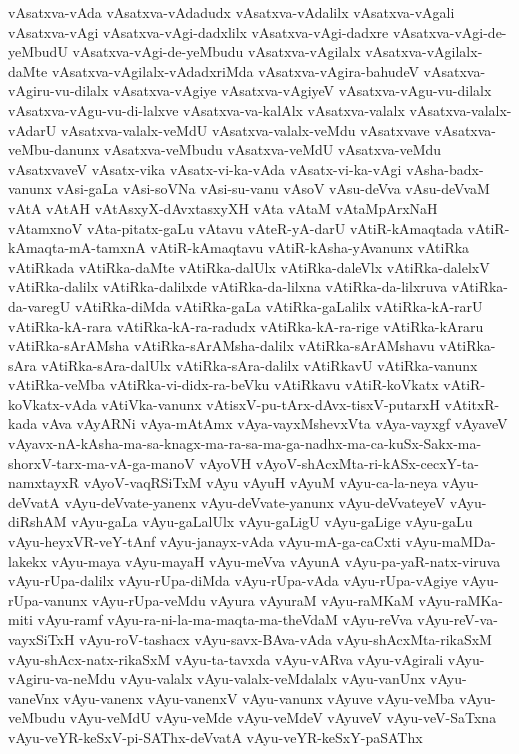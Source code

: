 {vAsatxva-vAda
vAsatxva-vAdadudx
vAsatxva-vAdalilx
vAsatxva-vAgali
vAsatxva-vAgi
vAsatxva-vAgi-dadxlilx
vAsatxva-vAgi-dadxre
vAsatxva-vAgi-de-yeMbudU
vAsatxva-vAgi-de-yeMbudu
vAsatxva-vAgilalx
vAsatxva-vAgilalx-daMte
vAsatxva-vAgilalx-vAdadxriMda
vAsatxva-vAgira-bahudeV
vAsatxva-vAgiru-vu-dilalx
vAsatxva-vAgiye
vAsatxva-vAgiyeV
vAsatxva-vAgu-vu-dilalx
vAsatxva-vAgu-vu-di-lalxve
vAsatxva-va-kalAlx
vAsatxva-valalx
vAsatxva-valalx-vAdarU
vAsatxva-valalx-veMdU
vAsatxva-valalx-veMdu
vAsatxvave
vAsatxva-veMbu-danunx
vAsatxva-veMbudu
vAsatxva-veMdU
vAsatxva-veMdu
vAsatxvaveV
vAsatx-vika
vAsatx-vi-ka-vAda
vAsatx-vi-ka-vAgi
vAsha-badx-vanunx
vAsi-gaLa
vAsi-soVNa
vAsi-su-vanu
vAsoV
vAsu-deVva
vAsu-deVvaM
vAtA
vAtAH
vAtAsxyX-dAvxtasxyXH
vAta
vAtaM
vAtaMpArxNaH
vAtamxnoV
vAta-pitatx-gaLu
vAtavu
vAteR-yA-darU
vAtiR-kAmaqtada
vAtiR-kAmaqta-mA-tamxnA
vAtiR-kAmaqtavu
vAtiR-kAsha-yAvanunx
vAtiRka
vAtiRkada
vAtiRka-daMte
vAtiRka-dalUlx
vAtiRka-daleVlx
vAtiRka-dalelxV
vAtiRka-dalilx
vAtiRka-dalilxde
vAtiRka-da-lilxna
vAtiRka-da-lilxruva
vAtiRka-da-varegU
vAtiRka-diMda
vAtiRka-gaLa
vAtiRka-gaLalilx
vAtiRka-kA-rarU
vAtiRka-kA-rara
vAtiRka-kA-ra-radudx
vAtiRka-kA-ra-rige
vAtiRka-kAraru
vAtiRka-sArAMsha
vAtiRka-sArAMsha-dalilx
vAtiRka-sArAMshavu
vAtiRka-sAra
vAtiRka-sAra-dalUlx
vAtiRka-sAra-dalilx
vAtiRkavU
vAtiRka-vanunx
vAtiRka-veMba
vAtiRka-vi-didx-ra-beVku
vAtiRkavu
vAtiR-koVkatx
vAtiR-koVkatx-vAda
vAtiVka-vanunx
vAtisxV-pu-tArx-dAvx-tisxV-putarxH
vAtitxR-kada
vAva
vAyARNi
vAya-mAtAmx
vAya-vayxMshevxVta
vAya-vayxgf
vAyaveV
vAyavx-nA-kAsha-ma-sa-knagx-ma-ra-sa-ma-ga-nadhx-ma-ca-kuSx-Sakx-ma-shorxV-tarx-ma-vA-ga-manoV
vAyoVH
vAyoV-shAcxMta-ri-kASx-cecxY-ta-namxtayxR
vAyoV-vaqRSiTxM
vAyu
vAyuH
vAyuM
vAyu-ca-la-neya
vAyu-deVvatA
vAyu-deVvate-yanenx
vAyu-deVvate-yanunx
vAyu-deVvateyeV
vAyu-diRshAM
vAyu-gaLa
vAyu-gaLalUlx
vAyu-gaLigU
vAyu-gaLige
vAyu-gaLu
vAyu-heyxVR-veY-tAnf
vAyu-janayx-vAda
vAyu-mA-ga-caCxti
vAyu-maMDa-lakekx
vAyu-maya
vAyu-mayaH
vAyu-meVva
vAyunA
vAyu-pa-yaR-natx-viruva
vAyu-rUpa-dalilx
vAyu-rUpa-diMda
vAyu-rUpa-vAda
vAyu-rUpa-vAgiye
vAyu-rUpa-vanunx
vAyu-rUpa-veMdu
vAyura
vAyuraM
vAyu-raMKaM
vAyu-raMKa-miti
vAyu-ramf
vAyu-ra-ni-la-ma-maqta-ma-theVdaM
vAyu-reVva
vAyu-reV-va-vayxSiTxH
vAyu-roV-tashacx
vAyu-savx-BAva-vAda
vAyu-shAcxMta-rikaSxM
vAyu-shAcx-natx-rikaSxM
vAyu-ta-tavxda
vAyu-vARva
vAyu-vAgirali
vAyu-vAgiru-va-neMdu
vAyu-valalx
vAyu-valalx-veMdalalx
vAyu-vanUnx
vAyu-vaneVnx
vAyu-vanenx
vAyu-vanenxV
vAyu-vanunx
vAyuve
vAyu-veMba
vAyu-veMbudu
vAyu-veMdU
vAyu-veMde
vAyu-veMdeV
vAyuveV
vAyu-veV-SaTxna
vAyu-veYR-keSxV-pi-SAThx-deVvatA
vAyu-veYR-keSxY-paSAThx
}
